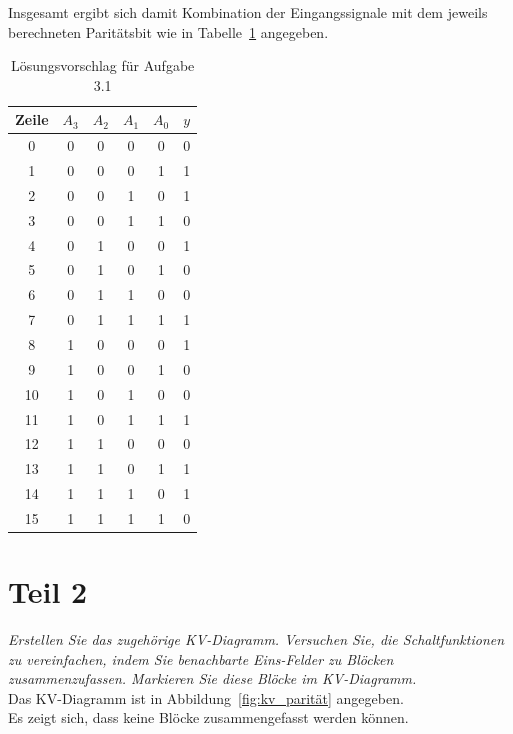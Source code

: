 \noindent
Insgesamt ergibt sich damit Kombination der Eingangssignale mit dem jeweils berechneten Paritätsbit wie in Tabelle~\ref{tab:paritätsbit} angegeben.


\begin{table}[ht]
    \setlength{\tabcolsep}{0.5em}
    \def\arraystretch{1.5}
    \centering
   \begin{tabular}{|c|c|c|c|c||c|}
        \hline
        \textbf{Zeile} & $A_3$ & $A_2$ & $A_1$ & $A_0$ & $y$ \\
        \hline \hline
        0  & 0 & 0 & 0 & 0 & 0 \\ \hline
        1  & 0 & 0 & 0 & 1 & 1 \\ \hline
        2  & 0 & 0 & 1 & 0 & 1 \\ \hline
        3  & 0 & 0 & 1 & 1 & 0 \\ \hline
        4  & 0 & 1 & 0 & 0 & 1 \\ \hline
        5  & 0 & 1 & 0 & 1 & 0 \\ \hline
        6  & 0 & 1 & 1 & 0 & 0 \\ \hline
        7  & 0 & 1 & 1 & 1 & 1 \\ \hline
        8  & 1 & 0 & 0 & 0 & 1 \\ \hline
        9  & 1 & 0 & 0 & 1 & 0 \\ \hline
        10 & 1 & 0 & 1 & 0 & 0 \\ \hline
        11 & 1 & 0 & 1 & 1 & 1 \\ \hline
        12 & 1 & 1 & 0 & 0 & 0 \\ \hline
        13 & 1 & 1 & 0 & 1 & 1 \\ \hline
        14 & 1 & 1 & 1 & 0 & 1 \\ \hline
        15 & 1 & 1 & 1 & 1 & 0 \\
        \hline
    \end{tabular}
    \caption{Lösungsvorschlag für Aufgabe 3.1}
    \label{tab:paritätsbit}
\end{table}

\section{Teil 2}

\textit{Erstellen Sie das zugehörige KV-Diagramm.
Versuchen Sie, die Schaltfunktionen zu vereinfachen, indem Sie benachbarte Eins-Felder zu Blöcken zusammenzufassen. Markieren Sie diese Blöcke im KV-Diagramm.}\\

\noindent
Das KV-Diagramm ist in Abbildung~\ref{fig:kv_parität} angegeben.\\
Es zeigt sich, dass keine Blöcke zusammengefasst werden können.


